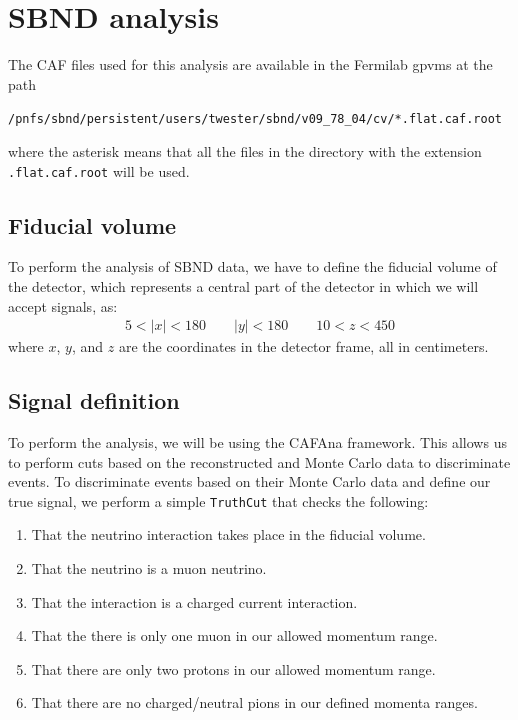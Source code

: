 \documentclass{article}
\begin{document}
\clearpage

\section{SBND analysis}

The CAF files used for this analysis are available in the Fermilab gpvms at the 
path

\begin{center}
    \verb|/pnfs/sbnd/persistent/users/twester/sbnd/v09_78_04/cv/*.flat.caf.root|
\end{center}

\noindent where the asterisk means that all the files in the directory with the extension 
\verb|.flat.caf.root| will be used.

\subsection{Fiducial volume}

To perform the analysis of SBND data, we have to define the fiducial volume of the detector, which represents
a central part of the detector in which we will accept signals, as:
\begin{align}
    5 < |x| < 180 \qquad |y| < 180 \qquad 10 < z < 450
\end{align}
where $x$, $y$, and $z$ are the coordinates in the detector frame, all in centimeters.

\subsection{Signal definition}

To perform the analysis, we will be using the CAFAna framework. This allows us to perform cuts based on the reconstructed and Monte Carlo data to discriminate events. 
To discriminate events based on their Monte Carlo data and define our true signal, we perform a simple \verb|TruthCut| that checks the following:
\begin{enumerate}[label=(\roman*)]
    \item That the neutrino interaction takes place in the fiducial volume.
    \item That the neutrino is a muon neutrino.
    \item That the interaction is a charged current interaction.
    \item That the there is only one muon in our allowed momentum range.
    \item That there are only two protons in our allowed momentum range.
    \item That there are no charged/neutral pions in our defined momenta ranges.
\end{enumerate}
\end{document}
